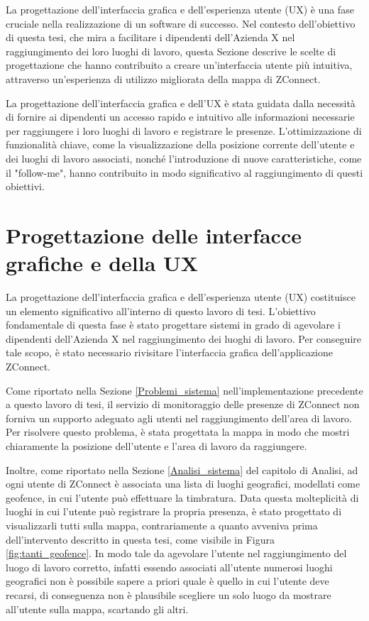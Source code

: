 La progettazione dell'interfaccia grafica e dell'esperienza utente (UX) è una fase cruciale nella realizzazione di un software di successo. Nel contesto dell'obiettivo di questa tesi, che mira a facilitare i dipendenti dell'Azienda X nel raggiungimento dei loro luoghi di lavoro, questa Sezione descrive le scelte di progettazione che hanno contribuito a creare un'interfaccia utente più intuitiva, attraverso un'esperienza di utilizzo migliorata della mappa di ZConnect.

La progettazione dell'interfaccia grafica e dell'UX è stata guidata dalla necessità di fornire ai dipendenti un accesso rapido e intuitivo alle informazioni necessarie per raggiungere i loro luoghi di lavoro e registrare le presenze. L'ottimizzazione di funzionalità chiave, come la visualizzazione della posizione corrente dell'utente e dei luoghi di lavoro associati, nonché l'introduzione di nuove caratteristiche, come il "follow-me", hanno contribuito in modo significativo al raggiungimento di questi obiettivi.

\section{Progettazione delle interfacce grafiche e della UX}\label{Progettazione}
La progettazione dell'interfaccia grafica e dell'esperienza utente (UX) costituisce un elemento significativo all'interno di questo lavoro di tesi. L'obiettivo fondamentale di questa fase è stato progettare sistemi in grado di agevolare i dipendenti dell'Azienda X nel raggiungimento dei luoghi di lavoro. Per conseguire tale scopo, è stato necessario rivisitare l'interfaccia grafica dell'applicazione ZConnect.

Come riportato nella Sezione \ref{Problemi_sistema} nell'implementazione precedente a questo lavoro di tesi, il servizio di monitoraggio delle presenze di ZConnect non forniva un supporto adeguato agli utenti nel raggiungimento dell'area di lavoro. Per risolvere questo problema, è stata progettata la mappa in modo che mostri chiaramente la posizione dell'utente e l'area di lavoro da raggiungere.

Inoltre, come riportato nella Sezione \ref{Analisi_sistema} del capitolo di Analisi, ad ogni utente di ZConnect è associata una lista di luoghi geografici, modellati come geofence, in cui l'utente può effettuare la timbratura. Data questa molteplicità di luoghi in cui l'utente può registrare la propria presenza, è stato progettato di visualizzarli tutti sulla mappa, contrariamente a quanto avveniva prima dell'intervento descritto in questa tesi, come visibile in Figura \ref{fig:tanti_geofence}. In modo tale da agevolare l'utente nel raggiungimento del luogo di lavoro corretto, infatti essendo associati all'utente numerosi luoghi geografici non è possibile sapere a priori quale è quello in cui l'utente deve recarsi, di conseguenza non è plausibile scegliere un solo luogo da mostrare all'utente sulla mappa, scartando gli altri.

